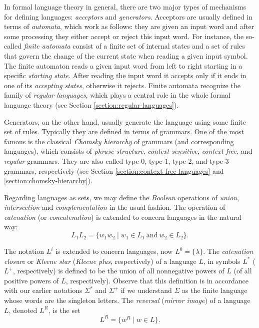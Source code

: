 In formal language theory in general, there are two major types of mechanisms for defining languages: \emph{acceptors} and \emph{generators}. Acceptors are usually defined in terms of \emph{automata}, which work as follows: they are given an input word and after some processing they either accept or reject this input word. For instance, the so-called \emph{finite automata} consist of a finite set of internal states and a set of rules that govern the change of the current state when reading a given input symbol. The finite automaton reads a given input word from left to right starting in a specific \emph{starting state}. After reading the input word it accepts only if it ends in one of its \emph{accepting states}, otherwise it rejects. Finite automata recognize the family of \emph{regular languages}, which plays a central role in the whole formal language theory (see Section \ref{section:regular-languages}).

Generators, on the other hand, usually generate the language using some finite set of rules. Typically they are defined in terms of grammars. One of the most famous is the classical \emph{Chomsky hierarchy} of grammars (and corresponding languages), which consists of \emph{phrase-structure}, \emph{context-sensitive}, \emph{context-free}, and \emph{regular} grammars. They are also called type $0$, type $1$, type $2$, and type $3$ grammars, respectively (see Section \ref{section:context-free-languages} and \ref{section:chomsky-hierarchy}).

Regarding languages as sets, we may define the \emph{Boolean} operations of \emph{union}, \emph{intersection} and \emph{complementation} in the usual fashion. The operation of \emph{catenation} (or \emph{concatenation}) is extended to concern languages in the natural way: $$L_1 L_2 = \{w_1 w_2 \mid w_1 \in L_1 \ \text{and} \ w_2 \in L_2\}.$$

The notation $L^i$ is extended to concern languages, now $L^0 = \{\lambda\}$. The \emph{catenation closure} or  \emph{Kleene star} (\emph{Kleene plus}, respectively) of a language $L$, in symbols $L^*$ ($L^+$, respectively) is defined to be the union of all nonnegative powers of $L$ (of all positive powers of $L$, respectively). Observe that this definition is in accordance with our earlier notations $\Sigma^*$ and $\Sigma^+$ if we understand $\Sigma$ as the finite language whose words are the singleton letters. The \emph{reversal} (\emph{mirror image}) of a language $L$, denoted $L^R$, is the set $$L^R = \{w^R \mid w \in L\}.$$

